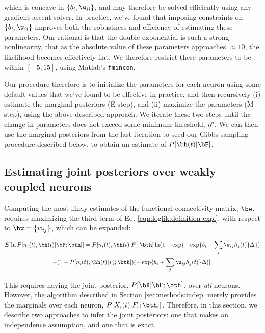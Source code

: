 \noindent which is concave in $\{b_i, \w_{ii}\}$, and may therefore be solved efficiently using any gradient ascent solver. In practice, we've found that imposing constraints on $\{b_i, \w_{ii}\}$ improves both the robustness and efficiency of estimating these parameters.  Our rational is that the double exponential is such a strong nonlinearity, that as the absolute value of these parameters approaches $\approx 10$, the likelihood becomes effectively flat.  We therefore restrict these parameters to be within $[-5,15]$, using Matlab's \texttt{fmincon}.

Our procedure therefore is to initialize the parameters for each neuron using some default values that we've found to be effective in practice, and then recursively (i) estimate the marginal posteriors (E step), and (ii) maximize the parameters (M step), using the above described approach.  We iterate these two steps until the change in parameters does not exceed some minimum threshold, $\eta^n$.  We can then use the marginal posteriors from the last iteration to seed our Gibbs sampling procedure described below, to obtain an estimate of $P[\bh(t) | \bF]$.

\subsection{Estimating joint posteriors over weakly coupled neurons}
\label{sec:methods:joint}

Computing the most likely estimates of the functional connectivity matrix, $\bw$, requires maximizing the third term of Eq. \eqref{eqn:loglik:definition-expl}, with respect to $\bw=\{w_{ij}\}$, which can be expanded:

\begin{multline} \label{eqn:bws}
	E [\ln P[n_i(t), \bh(t) | \bF; \bth]] = P[n_i(t), \bh(t) | F_i; \bth] \ln (1-\exp\{-\exp\{b_i + \sum_j \w_{ij} h_j(t)\}\Delta\})
	\\ +  (1-P[n_i(t), \bh(t) | F_i; \bth]) (-\exp\{b_i + \sum_j \w_{ij} h_j(t)\}\Delta)].
\end{multline}

\noindent This requires having the joint posterior, $P[\bX | \bF; \bth]$, over \emph{all} neurons.  However, the algorithm described in Section \ref{sec:methods:indep} merely provides the marginals over each neuron, $P[X_i(t) | F_i; \bth_i]$.  Therefore, in this section, we describe two approaches to infer the joint posteriors: one that makes an independence assumption, and one that is exact.

